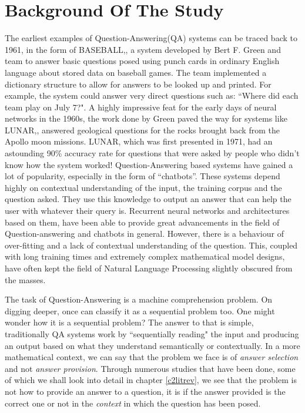 \documentclass[a4paper,12pt]{report}
\begin{document}
        \section{Background Of The Study}\label{c11}
		    The earliest examples of Question-Answering(QA) systems can be traced back to 1961, in the form of BASEBALL,\citep{green1961baseball}, a system developed by Bert F. Green and team to answer basic questions posed using punch cards in ordinary English language about stored data on baseball games. The team implemented a dictionary structure to allow for answers to be looked up and printed. For example, the system could answer very direct questions such as: ``Where did each team play on July 7?".
		    A highly impressive feat for the early days of neural networks in the 1960s, the work done by Green paved the way for systems like LUNAR,\citep{lunar}, answered geological questions for the rocks brought back from the Apollo moon missions. LUNAR, which was first presented in 1971, had an astounding 90\% accuracy rate for questions that were asked by people who didn't know how the system worked!
		    Question-Answering based systems have gained a lot of popularity, especially in the form of ``chatbots''. These systems depend highly on contextual understanding of the input, the training corpus and the question asked. They use this knowledge to output an answer that can help the user with whatever their query is. Recurrent neural networks and architectures based on them, have been able to provide great advancements in the field of Question-answering and chatbots in general. However, there is a behaviour of over-fitting and a lack of contextual understanding of the question. This, coupled with long training times and extremely complex mathematical model designs, have often kept the field of Natural Language Processing slightly obscured from the masses.
		    
		    The task of Question-Answering is a machine comprehension problem. On digging deeper, once can classify it as a sequential problem too. One might wonder how it is a sequential problem? The answer to that is simple, traditionally QA systems work by ``sequentially reading" the input and producing an output based on what they understand semantically or contextually. 
		    In a more mathematical context, we can say that the problem we face is of \textit{answer selection} and not \textit{answer provision}. Through numerous studies that have been done, some of which we shall look into detail in chapter \ref{c2litrev}, we see that the problem is not how to provide an answer to a question, it is if the answer provided is the correct one or not in the \textit{context} in which the question has been posed.
		
\end{document}
